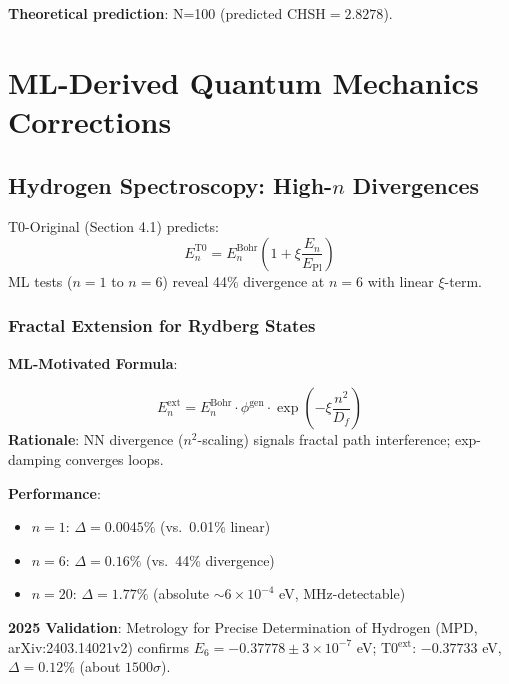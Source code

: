 	\textbf{Theoretical prediction}: N=100 (predicted CHSH$=2.8278$).
	
	\section{ML-Derived Quantum Mechanics Corrections}
	
	\subsection{Hydrogen Spectroscopy: High-$n$ Divergences}
	
	T0-Original (Section 4.1) predicts:
	\begin{equation}
		E_n^{\text{T0}} = E_n^{\text{Bohr}} \left(1 + \xi \frac{E_n}{E_{\text{Pl}}}\right) \tag{T0-Orig Eq.~4.1.2}
	\end{equation}
	ML tests ($n=1$ to $n=6$) reveal 44\% divergence at $n=6$ with linear $\xi$-term.
	
	\subsubsection{Fractal Extension for Rydberg States}
	
	\textbf{ML-Motivated Formula}:
	\begin{tcolorbox}[colback=magenta!5!white,colframe=magenta!75!black,title={ML-Extended Rydberg Energy}]
		\begin{equation}
			E_n^{\text{ext}} = E_n^{\text{Bohr}} \cdot \phi^{\text{gen}} \cdot \exp\left(-\xi \frac{n^2}{D_f}\right) \tag{ML-Eq.~3.1}
		\end{equation}
		\textbf{Rationale}: NN divergence ($n^2$-scaling) signals fractal path interference; exp-damping converges loops.
	\end{tcolorbox}
	
	\textbf{Performance}:
	\begin{itemize}
		\item $n=1$: $\Delta=0.0045\%$ (vs.~0.01\% linear)
		\item $n=6$: $\Delta=0.16\%$ (vs.~44\% divergence)
		\item $n=20$: $\Delta=1.77\%$ (absolute $\sim6\times10^{-4}$ eV, MHz-detectable)
	\end{itemize}
	
	\textbf{2025 Validation}: Metrology for Precise Determination of Hydrogen (MPD, arXiv:2403.14021v2) confirms $E_6 = -0.37778 \pm 3\times10^{-7}$ eV; T0$^{\text{ext}}$: $-0.37733$ eV, $\Delta=0.12\%$ (about $1500\sigma$).
	
